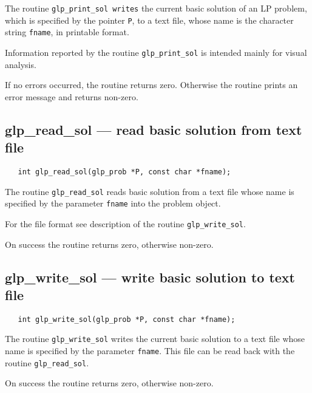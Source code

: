 \description

The routine \verb|glp_print_sol writes| the current basic solution of
an LP problem, which is specified by the pointer \verb|P|, to a text
file, whose name is the character string \verb|fname|, in printable
format.

Information reported by the routine \verb|glp_print_sol| is intended
mainly for visual analysis.

\returns

If no errors occurred, the routine returns zero. Otherwise the routine
prints an error message and returns non-zero.

\subsection{glp\_read\_sol --- read basic solution from text file}

\synopsis

\begin{verbatim}
   int glp_read_sol(glp_prob *P, const char *fname);
\end{verbatim}

\description

The routine \verb|glp_read_sol| reads basic solution from a text file
whose name is specified by the parameter \verb|fname| into the problem
object.

For the file format see description of the routine
\verb|glp_write_sol|.

\returns

On success the routine returns zero, otherwise non-zero.

\subsection{glp\_write\_sol --- write basic solution to text file}

\synopsis

\begin{verbatim}
   int glp_write_sol(glp_prob *P, const char *fname);
\end{verbatim}

\description

The routine \verb|glp_write_sol| writes the current basic solution to
a text file whose name is specified by the parameter \verb|fname|. This
file can be read back with the routine \verb|glp_read_sol|.

\returns

On success the routine returns zero, otherwise non-zero.

